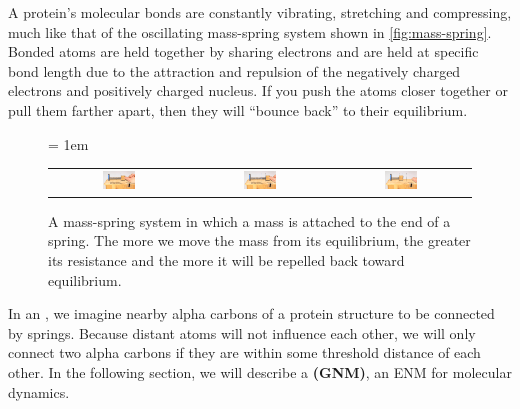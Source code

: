A protein's molecular bonds are constantly vibrating, stretching and compressing, much like that of the oscillating mass-spring system shown in \autoref{fig:mass-spring}. Bonded atoms are held together by sharing electrons and are held at specific bond length due to the attraction and repulsion of the negatively charged electrons and positively charged nucleus. If you push the atoms closer together or pull them farther apart, then they will ``bounce back'' to their equilibrium.\\

\begin{figure}[h]
	\centering
	\tabcolsep = 1em
	\mySfFamily
	\begin{tabular}{c c c}
		\includegraphics[width = 0.25\textwidth]{../images/mass_spring1.png} & \includegraphics[width = 0.25\textwidth]{../images/mass_spring2.png} & \includegraphics[width = 0.25\textwidth]{../images/mass_spring3.png}
	\end{tabular}
	\caption{A mass-spring system in which a mass is attached to the end of a spring. The more we move the mass from its equilibrium, the greater its resistance and the more it will be repelled back toward equilibrium.}
	\label{fig:mass-spring}
\end{figure}


In an , we imagine nearby alpha carbons of a protein structure to be connected by springs. Because distant atoms will not influence each other, we will only connect two alpha carbons if they are within some threshold distance of each other. In the following section, we will describe a  \textbf{(GNM)}, an ENM for molecular dynamics.

